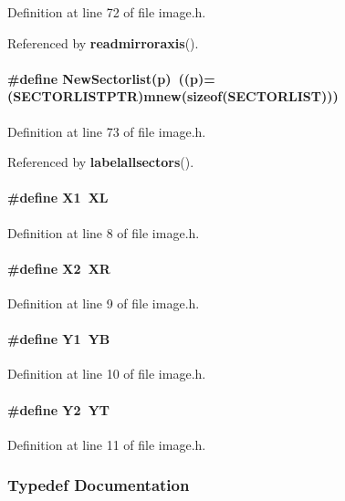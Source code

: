 Definition at line 72 of file image.h.

Referenced by {\bf readmirroraxis}().\label{image.h_a5}
\paragraph{\setlength{\rightskip}{0pt plus 5cm}\#define New\-Sectorlist(p)\ ((p)=({\bf SECTORLISTPTR})mnew(sizeof({\bf SECTORLIST})))}\hfill



Definition at line 73 of file image.h.

Referenced by {\bf labelallsectors}().\label{image.h_a0}
\paragraph{\setlength{\rightskip}{0pt plus 5cm}\#define X1\ XL}\hfill



Definition at line 8 of file image.h.\label{image.h_a1}
\paragraph{\setlength{\rightskip}{0pt plus 5cm}\#define X2\ XR}\hfill



Definition at line 9 of file image.h.\label{image.h_a2}
\paragraph{\setlength{\rightskip}{0pt plus 5cm}\#define Y1\ YB}\hfill



Definition at line 10 of file image.h.\label{image.h_a3}
\paragraph{\setlength{\rightskip}{0pt plus 5cm}\#define Y2\ YT}\hfill



Definition at line 11 of file image.h.

\subsubsection{Typedef Documentation}
\label{image.h_a12}
